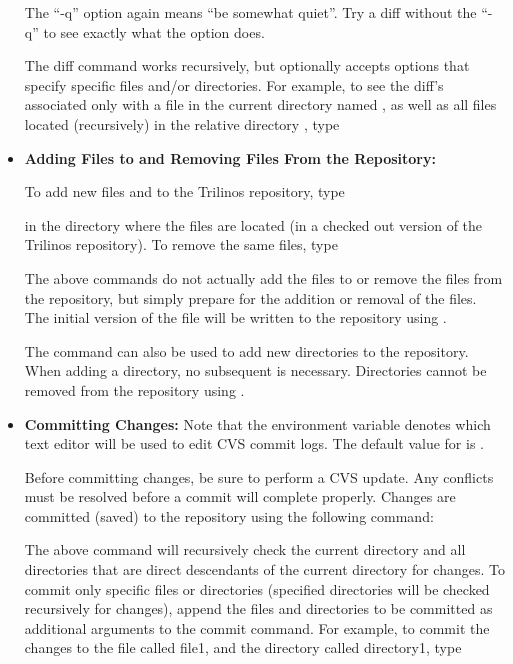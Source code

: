 \documentclass[12pt,relax]{TrilinosDevGuide}
\begin{document}
\begin{itemize}

The ``-q'' option again means ``be somewhat quiet''.  Try a diff without the 
``-q'' to see exactly what the option does.  

The diff command works recursively, but optionally accepts options that 
specify specific files and/or directories.  For example, to see the diff's 
associated only with a file in the current directory named 
, as well as all files located (recursively) in the 
relative directory , type


\item {\bf Adding Files to and Removing Files From the Repository:}

To add new files  and  to the 
Trilinos repository, type


in the directory where the files are located (in a checked out version of the 
Trilinos repository).  To remove the same files, type


The above commands do not actually add the files to or remove the files from 
the repository, but simply prepare for the addition or removal of the files.  
The initial version of the file will be written to the repository using 
.

The  command can also be 
used to add new directories to the repository.  When adding a directory, no 
subsequent  is necessary.  Directories cannot be 
removed from the repository using .

\item{\bf Committing Changes:}
Note that the  environment variable denotes which 
text editor will be used to edit CVS commit logs.  The default value for
 is .

Before committing changes, be sure to perform a CVS update.  Any conflicts 
must be resolved before a commit will complete properly.  Changes are 
committed (saved) to the repository using the following command:


The above command will recursively check the current directory and all 
directories that are direct descendants of the current directory for changes.  
To commit only specific files or directories (specified directories will be 
checked recursively for changes), append the files and directories to be 
committed as additional arguments to the commit command.  For example, to 
commit the changes to the file called file1, and the directory called 
directory1, type


\end{itemize}
\end{document}
